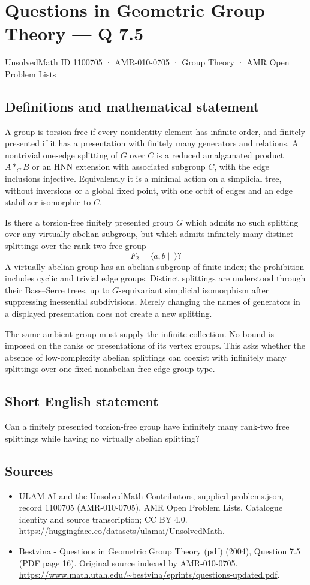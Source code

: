 \documentclass[11pt,a4paper]{article}
\begin{document}
\section*{Questions in Geometric Group Theory — Q 7.5}\label{1100705}
{\small UnsolvedMath ID 1100705 · AMR-010-0705 · Group Theory · AMR Open Problem Lists}
\subsection{Definitions and mathematical statement}
A group is torsion-free if every nonidentity element has infinite order, and finitely presented if it has a presentation with finitely many generators and relations. A nontrivial one-edge splitting of $G$ over $C$ is a reduced amalgamated product $A*_C B$ or an HNN extension with associated subgroup $C$, with the edge inclusions injective. Equivalently it is a minimal action on a simplicial tree, without inversions or a global fixed point, with one orbit of edges and an edge stabilizer isomorphic to $C$.

Is there a torsion-free finitely presented group $G$ which admits no such splitting over any virtually abelian subgroup, but which admits infinitely many distinct splittings over the rank-two free group
\[
 F_2=\langle a,b\mid\ \rangle?
\]
A virtually abelian group has an abelian subgroup of finite index; the prohibition includes cyclic and trivial edge groups. Distinct splittings are understood through their Bass--Serre trees, up to $G$-equivariant simplicial isomorphism after suppressing inessential subdivisions. Merely changing the names of generators in a displayed presentation does not create a new splitting.

The same ambient group must supply the infinite collection. No bound is imposed on the ranks or presentations of its vertex groups. This asks whether the absence of low-complexity abelian splittings can coexist with infinitely many splittings over one fixed nonabelian free edge-group type.
\subsection{Short English statement}
Can a finitely presented torsion-free group have infinitely many rank-two free splittings while having no virtually abelian splitting?
\subsection{Sources}
\begin{itemize}
\item[S1] ULAM.AI and the UnsolvedMath Contributors, supplied problems.json, record 1100705 (AMR-010-0705), AMR Open Problem Lists. Catalogue identity and source transcription; CC BY 4.0.
\url{https://huggingface.co/datasets/ulamai/UnsolvedMath}.
\item[S2] Bestvina - Questions in Geometric Group Theory (pdf) (2004), Question 7.5 (PDF page 16). Original source indexed by AMR-010-0705.
\url{https://www.math.utah.edu/~bestvina/eprints/questions-updated.pdf}.
\end{itemize}
\end{document}
